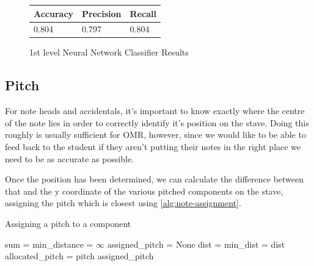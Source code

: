 \begin{figure}[H]
  \vspace{0.8cm}

  \begin{subtable}[b]{.4\linewidth}
    \begin{tabularx}{\linewidth}{lll}
      \toprule
      Accuracy & Precision & Recall \\
      \midrule
      0.804 & 0.797 & 0.804 \\
      \bottomrule
    \end{tabularx}
  \end{subtable}

  \vspace{0.4cm}

  \caption{1st level Neural Network Classifier Results}
  \label{fig:nn-classification-data}
\end{figure}

\subsection{Pitch}
\label{sec:pitch-identification}

For note heads and accidentals, it's important to know exactly where the centre of the note lies in order to correctly identify it's position on the stave. Doing this roughly is usually sufficient for OMR, however, since we would like to be able to feed back to the student if they aren't putting their notes in the right place  we need to be as accurate as possible.

Once the position has been determined, we can calculate the difference between that and the y coordinate of the various pitched components on the stave, assigning the pitch which is closest using \cref{alg:note-assignment}.

\begin{algorithm}[H]
\caption{Assigning a pitch to a component}
\label{alg:note-assignment}
\begin{algorithmic}[1]
    \State sum = 
    \State min\_distance = $\infty$
    \State assigned\_pitch = None
      \State dist = 
        \State min\_dist = dist
        \State allocated\_pitch = pitch
      \EndIf
	\EndFor
	\Return assigned\_pitch
\EndProcedure
\end{algorithmic}
\end{algorithm}

